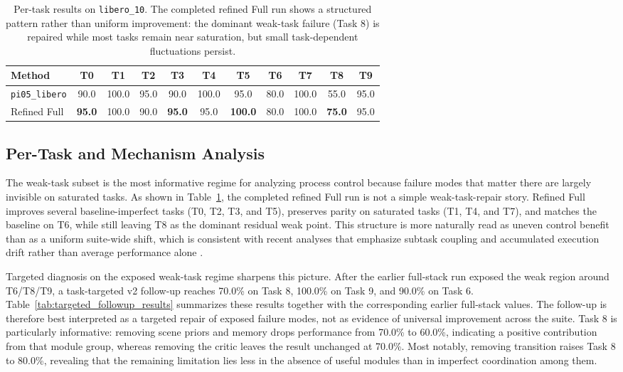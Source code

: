 \documentclass[a4paper]{Template/LaTeX_Templates/waica}
\begin{document}
\begin{table}[t]
\caption{Per-task results on \texttt{libero\_10}. The completed refined Full run shows a structured pattern rather than uniform improvement: the dominant weak-task failure (Task 8) is repaired while most tasks remain near saturation, but small task-dependent fluctuations persist.}
\label{tab:libero10_task_results}
\centering
\begin{tabular}{lcccccccccc}
\toprule
Method & T0 & T1 & T2 & T3 & T4 & T5 & T6 & T7 & T8 & T9 \\
\midrule
\texttt{pi05\_libero} & 90.0 & 100.0 & 95.0 & 90.0 & 100.0 & 95.0 & 80.0 & 100.0 & 55.0 & 95.0 \\
Refined Full & \textbf{95.0} & 100.0 & 90.0 & \textbf{95.0} & 95.0 & \textbf{100.0} & 80.0 & 100.0 & \textbf{75.0} & 95.0 \\
\bottomrule
\end{tabular}
\end{table}

\subsection{Per-Task and Mechanism Analysis}

The weak-task subset is the most informative regime for analyzing process control because failure modes that matter there are largely invisible on saturated tasks. As shown in Table~\ref{tab:libero10_task_results}, the completed refined Full run is not a simple weak-task-repair story. Refined Full improves several baseline-imperfect tasks (T0, T2, T3, and T5), preserves parity on saturated tasks (T1, T4, and T7), and matches the baseline on T6, while still leaving T8 as the dominant residual weak point. This structure is more naturally read as uneven control benefit than as a uniform suite-wide shift, which is consistent with recent analyses that emphasize subtask coupling and accumulated execution drift rather than average performance alone \cite{longvla,robocerebra,guardian}.

Targeted diagnosis on the exposed weak-task regime sharpens this picture. After the earlier full-stack run exposed the weak region around T6/T8/T9, a task-targeted v2 follow-up reaches 70.0\% on Task 8, 100.0\% on Task 9, and 90.0\% on Task 6. Table~\ref{tab:targeted_followup_results} summarizes these results together with the corresponding earlier full-stack values. The follow-up is therefore best interpreted as a targeted repair of exposed failure modes, not as evidence of universal improvement across the suite. Task 8 is particularly informative: removing scene priors and memory drops performance from 70.0\% to 60.0\%, indicating a positive contribution from that module group, whereas removing the critic leaves the result unchanged at 70.0\%. Most notably, removing transition raises Task 8 to 80.0\%, revealing that the remaining limitation lies less in the absence of useful modules than in imperfect coordination among them.
\end{document}
